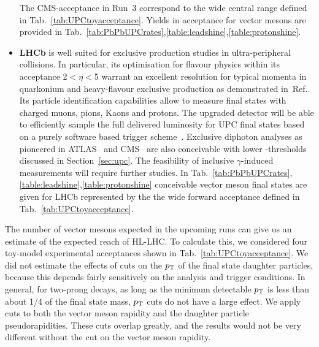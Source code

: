 \documentclass[../report.tex]{subfiles}
\begin{document}
\begin{itemize}
The CMS-acceptance in Run~3 correspond to the wide central range defined in Tab.~\ref{tab:UPCtoyacceptance}. Yields in acceptance for vector mesons are provided in Tab.~\ref{tab:PbPbUPCrates},\ref{table:leadshine},\ref{table:protonshine}.

\item \textbf{LHCb} is well suited for exclusive production studies in ultra-peripheral collisions. In particular, its optimisation for flavour physics within its acceptance 2$<\eta<$5 warrant an excellent resolution for typical momenta in quarkonium and heavy-flavour exclusive production as demonstrated in~Ref.\cite{LHCb-CONF-2018-003}. Its particle identification capabilities allow to measure final states with charged muons, pions, Kaons and protons.  The upgraded detector will be able to efficiently sample the full delivered luminosity for UPC final states based on a purely software based trigger scheme~\cite{LHCb-TDR-016}. Exclusive diphoton analyses as pioneered in ATLAS~\cite{Aaboud:2017bwk} and CMS~\cite{CMS-PAS-FSQ-16-012} are also conceivable with lower \ET-thresholds discussed in Section~\ref{sec:upc}. The feasibility of inclusive $\gamma$-induced measurements will require further studies. In Tab.~\ref{tab:PbPbUPCrates},\ref{table:leadshine},\ref{table:protonshine} conceivable vector meson final states are given for LHCb represented by the the  wide forward acceptance defined in Tab.~\ref{tab:UPCtoyacceptance}.
\end{itemize}

The number of vector mesons expected in the upcoming runs can give us an estimate of the expected reach of HL-LHC.   To calculate this, we considered four toy-model experimental acceptances shown in Tab.~\ref{tab:UPCtoyacceptance}.  We did not estimate the effects of cuts on the $p\sb{\scriptstyle\mathrm{T}}$ of the final state daughter particles, because this depends fairly sensitively on the analysis and trigger conditions.   In general, for two-prong decays, as long as the minimum detectable $p\sb{\scriptstyle\mathrm{T}}$ is less than about 1/4 of the final state mass, $p\sb{\scriptstyle\mathrm{T}}$ cuts do not have a large effect.  We apply cuts to both the vector meson rapidity and the daughter particle pseudorapidities.  These cuts overlap greatly, and the results would not be very different without the cut on the vector meson rapidity. 
\end{document}
